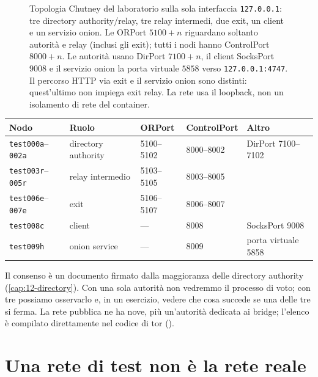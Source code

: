 \begin{figure}[htbp]
\centering

\caption{Topologia Chutney del laboratorio sulla sola interfaccia \texttt{127.0.0.1}: tre directory authority/relay, tre relay intermedi, due exit, un client e un servizio onion. Le ORPort $5100+n$ riguardano soltanto autorità e relay (inclusi gli exit); tutti i nodi hanno ControlPort $8000+n$. Le autorità usano DirPort $7100+n$, il client SocksPort $9008$ e il servizio onion la porta virtuale $5858$ verso \texttt{127.0.0.1:4747}. Il percorso HTTP via exit e il servizio onion sono distinti: quest'ultimo non impiega exit relay. La rete usa il loopback, non un isolamento di rete del container.}
\label{fig:rete-privata}
\end{figure}

\begin{center}\small
\begin{tabular}{lllll}
\toprule
Nodo & Ruolo & ORPort & ControlPort & Altro \\
\midrule
\texttt{test000a}--\texttt{002a} & directory authority & 5100--5102 & 8000--8002 & DirPort 7100--7102 \\
\texttt{test003r}--\texttt{005r} & relay intermedio & 5103--5105 & 8003--8005 & \\
\texttt{test006e}--\texttt{007e} & exit & 5106--5107 & 8006--8007 & \\
\texttt{test008c} & client & --- & 8008 & SocksPort 9008 \\
\texttt{test009h} & onion service & --- & 8009 & porta virtuale 5858 \\
\bottomrule
\end{tabular}
\end{center}

\begin{approfondimento}
Il consenso è un documento firmato dalla maggioranza delle directory authority (\cref{cap:12-directory}). Con una sola autorità non vedremmo il processo di voto; con tre possiamo osservarlo e, in un esercizio, vedere che cosa succede se una delle tre si ferma. La rete pubblica ne ha nove, più un'autorità dedicata ai bridge; l'elenco è compilato direttamente nel codice di tor ().
\end{approfondimento}

\section{Una rete di test non è la rete reale}\label{sec:rp-opzioni}

